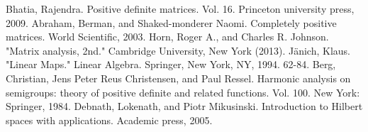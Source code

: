 \documentclass[12pt,twoside]{report}
\begin{document}
\newpage
{}
\begin{thebibliography}{9}
        Bhatia, Rajendra. Positive definite matrices. Vol. 16. Princeton university press, 2009.
        Abraham, Berman, and Shaked-monderer Naomi. Completely positive matrices. World Scientific, 2003.
        Horn, Roger A., and Charles R. Johnson. "Matrix analysis, 2nd." Cambridge University, New York (2013).
        Jänich, Klaus. "Linear Maps." Linear Algebra. Springer, New York, NY, 1994. 62-84.
        Berg, Christian, Jens Peter Reus Christensen, and Paul Ressel. Harmonic analysis on semigroups: theory of positive definite and related functions. Vol. 100. New York: Springer, 1984.
        Debnath, Lokenath, and Piotr Mikusinski. Introduction to Hilbert spaces with applications. Academic press, 2005.

\end{thebibliography}
\end{document}
